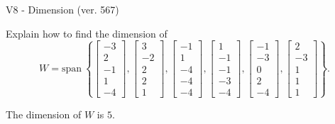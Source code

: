 \begin{exercise}
  \begin{exerciseTitle}V8 - Dimension (ver. 567)\end{exerciseTitle}
  \begin{exerciseStatement}
    Explain how to find the dimension of 
\[W=\mathrm{span}\ \left\{\left[\begin{array}{r}
-3 \\
2 \\
-1 \\
1 \\
-4
\end{array}\right] , \left[\begin{array}{r}
3 \\
-2 \\
2 \\
2 \\
1
\end{array}\right] , \left[\begin{array}{r}
-1 \\
1 \\
-4 \\
-4 \\
-4
\end{array}\right] , \left[\begin{array}{r}
1 \\
-1 \\
-1 \\
-3 \\
-4
\end{array}\right] , \left[\begin{array}{r}
-1 \\
-3 \\
0 \\
2 \\
-4
\end{array}\right] , \left[\begin{array}{r}
2 \\
-3 \\
1 \\
1 \\
1
\end{array}\right]\right\}.\]



  \end{exerciseStatement}
  \begin{exerciseAnswer}
   The dimension of \(W\) is  \(5\).
  


  \end{exerciseAnswer}
\end{exercise}